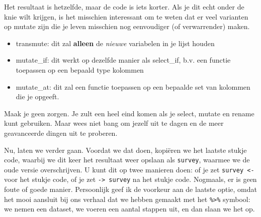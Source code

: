 \documentclass[]{tufte-book}
\newenvironment{Shaded}{}{}
\newcommand{\DataTypeTok}[1]{\textcolor[rgb]{0.56,0.13,0.00}{#1}}
\newcommand{\KeywordTok}[1]{\textcolor[rgb]{0.00,0.44,0.13}{\textbf{#1}}}
\newcommand{\NormalTok}[1]{#1}
\newcommand{\OperatorTok}[1]{\textcolor[rgb]{0.40,0.40,0.40}{#1}}
\newcommand{\StringTok}[1]{\textcolor[rgb]{0.25,0.44,0.63}{#1}}
\providecommand{\tightlist}{%
  \setlength{\itemsep}{0pt}\setlength{\parskip}{0pt}}
\begin{document}
Het resultaat is hetzelfde, maar de code is iets korter. Als je dit echt onder de knie wilt krijgen, is het misschien interessant om te weten dat er veel varianten op mutate zijn die je leven misschien nog eenvoudiger (of verwarrender) maken.

\begin{itemize}
\tightlist
\item
  transmute: dit zal \textbf{alleen} de \emph{nieuwe} variabelen in je lijst houden
\item
  mutate\_if: dit werkt op dezelfde manier als select\_if, b.v. een functie toepassen op een bepaald type kolommen
\item
  mutate\_at: dit zal een functie toepassen op een bepaalde set van kolommen die je opgeeft.
\end{itemize}

Maak je geen zorgen. Je zult een heel eind komen als je select, mutate en rename kunt gebruiken. Maar wees niet bang om jezelf uit te dagen en de meer geavanceerde dingen uit te proberen.

Nu, laten we verder gaan. Voordat we dat doen, kopiëren we het laatste stukje code, waarbij we dit keer het resultaat weer opslaan als \texttt{survey}, waarmee we de oude versie overschrijven. U kunt dit op twee manieren doen: of je zet \texttt{survey\ \textless{}-} voor het stukje code, of je zet \texttt{-\textgreater{}\ survey} na het stukje code. Nogmaals, er is geen foute of goede manier. Persoonlijk geef ik de voorkeur aan de laatste optie, omdat het mooi aansluit bij ons verhaal dat we hebben gemaakt met het \texttt{\%\textgreater{}\%} symbool: we nemen een dataset, we voeren een aantal stappen uit, en dan slaan we het op.

\begin{Shaded}
\end{Shaded}
\end{document}

